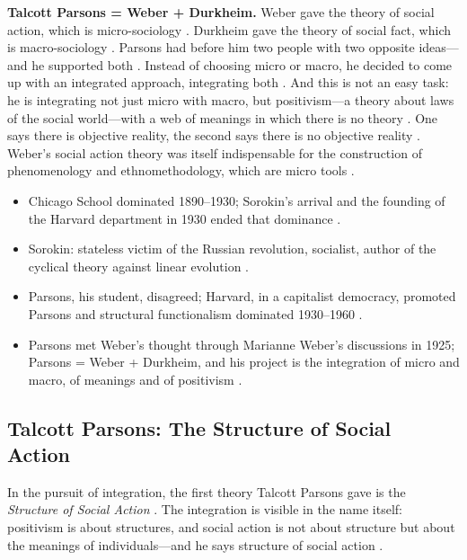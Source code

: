 \begin{KeyConcept}
\textbf{Talcott Parsons = Weber + Durkheim.}
Weber gave the theory of social action, which is micro-sociology . Durkheim gave the theory of social fact, which is macro-sociology . Parsons had before him two people with two opposite ideas---and he supported both .
Instead of choosing micro or macro, he decided to come up with an integrated approach, integrating both .
And this is not an easy task: he is integrating not just micro with macro, but positivism---a theory about laws of the social world---with a web of meanings in which there is no theory . One says there is objective reality, the second says there is no objective reality . Weber's social action theory was itself indispensable for the construction of phenomenology and ethnomethodology, which are micro tools .
\end{KeyConcept}

\begin{QuickRevision}
\begin{itemize}
    \item Chicago School dominated 1890--1930; Sorokin's arrival and the founding of the Harvard department in 1930 ended that dominance .
    \item Sorokin: stateless victim of the Russian revolution, socialist, author of the cyclical theory against linear evolution .
    \item Parsons, his student, disagreed; Harvard, in a capitalist democracy, promoted Parsons and structural functionalism dominated 1930--1960 .
    \item Parsons met Weber's thought through Marianne Weber's discussions in 1925; Parsons = Weber + Durkheim, and his project is the integration of micro and macro, of meanings and of positivism .
\end{itemize}
\end{QuickRevision}

\subsection{Talcott Parsons: The Structure of Social Action}
In the pursuit of integration, the first theory Talcott Parsons gave is the \textit{Structure of Social Action} . The integration is visible in the name itself: positivism is about structures, and social action is not about structure but about the meanings of individuals---and he says structure of social action .

